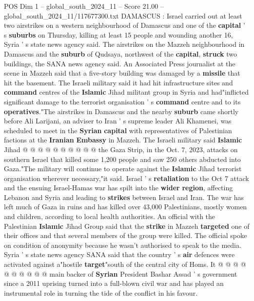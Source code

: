 \begin{textsample}{POS Dim 1 – global\_south\_2024\_11 – Score 21.00 – global\_south\_2024\_11/117677300.txt}  \label{ex:f1_pos_172}
DAMASCUS : Israel carried out at least two airstrikes on a western neighbourhood of Damascus and one of the \textbf{capital} ' s \textbf{suburbs} on Thursday, killing at least 15 people and wounding another 16, Syria ' s state news agency said.
The airstrikes on the Mazzeh neighbourhood in Damascus and the \textbf{suburb} of Qudsaya, northwest of the \textbf{capital}, \textbf{struck} two buildings, the SANA news agency said.
An Associated Press journalist at the scene in Mazzeh said that a five-story building was damaged by a \textbf{missile} that hit the basement.
The Israeli military said it had hit infrastructure sites and \textbf{command} centres of the \textbf{Islamic} Jihad militant group in Syria and had"inflicted significant damage to the terrorist organisation ' s \textbf{command} centre and to its \textbf{operatives}."The airstrikes in Damascus and the nearby \textbf{suburb} came shortly before Ali Larijani, an adviser to Iran ' s supreme leader Ali Khamenei, was scheduled to meet in the \textbf{Syrian} \textbf{capital} with representatives of Palestinian factions at the \textbf{Iranian} \textbf{Embassy} in Mazzeh.
The Israeli military said \textbf{Islamic} Jihad @ @ @ @ @ @ @ @ @ @ the Gaza Strip, in the Oct. 7, 2023, attacks on southern Israel that killed some 1,200 people and saw 250 others abducted into Gaza."The military will continue to operate against the \textbf{Islamic} Jihad terrorist organisation wherever necessary,"it said.
Israel ' s \textbf{retaliation} to the Oct 7 attack and the ensuing Israel-Hamas war has spilt into the \textbf{wider} \textbf{region}, affecting Lebanon and Syria and leading to \textbf{strikes} between Israel and Iran.
The war has left much of Gaza in ruins and has killed over 43,000 Palestinians, mostly women and children, according to local health authorities.
An official with the Palestinian \textbf{Islamic} Jihad Group said that the \textbf{strike} in Mazzeh \textbf{targeted} one of their offices and that several members of the group were killed.
The official spoke on condition of anonymity because he wasn't authorised to speak to the media.
Syria ' s state news agency SANA said that the country ' s \textbf{air} defences were activated against a"hostile \textbf{target}"south of the central city of Homs.
It @ @ @ @ @ @ @ @ @ @ main backer of \textbf{Syrian} President Bashar Assad ' s government since a 2011 uprising turned into a full-blown civil war and has played an instrumental role in turning the tide of the conflict in his favour.

\end{textsample}
